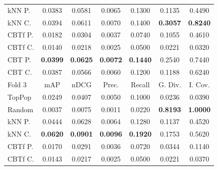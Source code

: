 \begin{table}[hbt]
\begin{tabulary}{\textwidth}{|L|CCCCCC|}
kNN P. & 0.0383 &           0.0581 &           0.0065 &           0.1300 &                                            0.1135 &                                            0.4490 \\
kNN C. & 0.0394 &           0.0611 &           0.0070 &           0.1400 &                                   \textbf{0.3057} &                                   \textbf{0.8240} \\
CBTf P. & 0.0182 &           0.0304 &           0.0037 &           0.0740 &                                            0.1055 &                                            0.4610 \\
CBTf C. & 0.0140 &           0.0218 &           0.0025 &           0.0500 &                                            0.0221 &                                            0.0320 \\
CBT P. & \textbf{0.0399} &  \textbf{0.0625} &  \textbf{0.0072} &  \textbf{0.1440} &                                            0.2540 &                                            0.7440 \\
CBT C. & 0.0387 &           0.0566 &           0.0060 &           0.1200 &                                            0.1188 &                                            0.6240 \\
\hline
\hline
Fold 3 & mAP & nDCG & Prec. & Recall & G. Div. & I. Cov. \\
\hline
TopPop & 0.0249 &           0.0407 &           0.0050 &           0.1000 &                                            0.0236 &                                            0.0390 \\
Random & 0.0037 &           0.0075 &           0.0011 &           0.0220 &                                   \textbf{0.8193} &                                   \textbf{1.0000} \\
kNN P. & 0.0444 &           0.0628 &           0.0064 &           0.1280 &                                            0.1137 &                                            0.4520 \\
kNN C. & \textbf{0.0620} &  \textbf{0.0901} &  \textbf{0.0096} &  \textbf{0.1920} &                                            0.1753 &                                            0.5620 \\
CBTf P. & 0.0170 &           0.0291 &           0.0036 &           0.0720 &                                            0.0344 &                                            0.1140 \\
CBTf C. & 0.0143 &           0.0217 &           0.0025 &           0.0500 &                                            0.0221 &                                            0.0370 \\

\end{tabulary}
\end{table}

